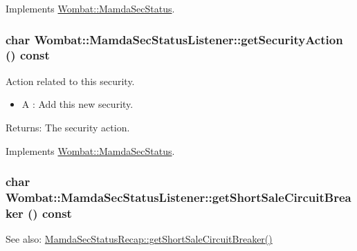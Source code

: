 Implements \hyperlink{classWombat_1_1MamdaSecStatus_6c6d3305ed2a2e06e8558647497a36d7}{Wombat::Mamda\-Sec\-Status}.\hypertarget{classWombat_1_1MamdaSecStatusListener_a0180f033edd189426cb0c7386f9fb4b}{
\subsubsection[getSecurityAction]{\setlength{\rightskip}{0pt plus 5cm}char Wombat::Mamda\-Sec\-Status\-Listener::get\-Security\-Action () const}}
\label{classWombat_1_1MamdaSecStatusListener_a0180f033edd189426cb0c7386f9fb4b}


Action related to this security. 

\begin{itemize}
\item A : Add this new security. \end{itemize}


\begin{Desc}
\item[Returns:]The security action. \end{Desc}


Implements \hyperlink{classWombat_1_1MamdaSecStatus_b143773aacba9fabb91693884ae8d87a}{Wombat::Mamda\-Sec\-Status}.\hypertarget{classWombat_1_1MamdaSecStatusListener_4cb86f6d7afb14e8d6411221d8941805}{
\subsubsection[getShortSaleCircuitBreaker]{\setlength{\rightskip}{0pt plus 5cm}char Wombat::Mamda\-Sec\-Status\-Listener::get\-Short\-Sale\-Circuit\-Breaker () const}}
\label{classWombat_1_1MamdaSecStatusListener_4cb86f6d7afb14e8d6411221d8941805}


\begin{Desc}
\item[See also:]\hyperlink{classWombat_1_1MamdaSecStatusRecap_80cb008d40d5435b74a3852926d3caa5}{Mamda\-Sec\-Status\-Recap::get\-Short\-Sale\-Circuit\-Breaker()} \end{Desc}


